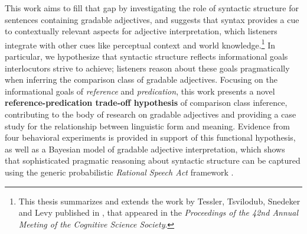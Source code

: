 This work aims to fill that gap by investigating the role of syntactic structure for sentences containing gradable adjectives, and suggests that syntax provides a cue to contextually relevant aspects for adjective interpretation, which listeners integrate with other cues like perceptual context and world knowledge.\footnote{This thesis summarizes and extends the work by Tessler, Tsvilodub, Snedeker and Levy published in \textcite{tessler2020}, that appeared in the \textit{Proceedings of the 42nd Annual Meeting of the Cognitive Science Society}.} In particular, we hypothesize that syntactic structure reflects informational goals interlocutors strive to achieve; listeners reason about these goals pragmatically when inferring the comparison class of gradable adjectives. Focusing on the informational goals of \textit{reference} and \textit{predication}, this work presents a novel \textbf{reference-predication trade-off hypothesis} of comparison class inference, contributing to the body of research on gradable adjectives and providing a case study for the relationship between linguistic form and meaning. Evidence from four behavioral experiments is provided in support of this functional hypothesis, as well as a Bayesian model of gradable adjective interpretation, which shows that sophisticated pragmatic reasoning about syntactic structure can be captured using the generic probabilistic \emph{Rational Speech Act} framework \parencite{goodman2016}. 
	

